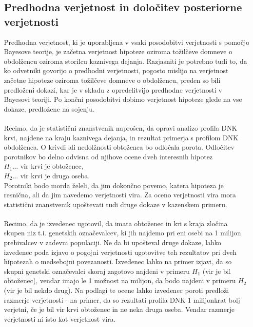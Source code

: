 \documentclass[12pt,a4paper]{amsart}
\theoremstyle{definition} %
\theoremstyle{plain} %
\begin{document}
\subsection{Predhodna verjetnost in določitev posteriorne verjetnosti}
Predhodna verjetnost, ki je uporabljena v vsaki posodobitvi verjetnosti s pomočjo Bayesove teorije, je začetna verjetnost hipoteze oziroma tožilčeve domneve 
o obdolžencu oziroma storilcu kaznivega dejanja. Razjasniti je potrebno tudi to, da ko odvetniki govorijo o predhodni verjetnosti, pogosto mislijo na verjetnost 
začetne hipoteze oziroma tožilčeve domneve o obdolžencu, preden so bili predloženi dokazi, kar je v skladu z opredelitvijo predhodne verjetnosti v Bayesovi 
teoriji. Po končni posodobitvi dobimo verjetnost hipoteze glede na vse dokaze, predložene na sojenju.\\\\
Recimo, da je statistični znanstvenik naprošen, da opravi analizo profila DNK krvi, najdene na kraju kaznivega dejanja, in rezultat primerja s profilom DNK
obdolženca. O krivdi ali nedolžnosti obtoženca bo odločala porota. Odločitev porotnikov bo delno odvisna od njihove ocene dveh interesnih
hipotez\\
$H_1 \dots$ vir krvi je obtoženec,\\
$H_2 \dots$ vir krvi je druga oseba.\\
Porotniki bodo morda želeli, da jim dokončno povemo, katera hipoteza je resnična, ali da jim navedemo verjetnosti vira. Za oceno verjetnosti 
vira mora statistični znanstvenik upoštevati tudi druge dokaze v kazenskem primeru.\\\\
Recimo, da je izvedenec ugotovil, da imata obtoženec in kri s kraja zločina skupen niz t.i. genetskih označevalcev, ki jih najdemo pri eni osebi
na 1 milijon prebivalcev v zadevni populaciji. Ne da bi upošteval druge dokaze, lahko izvedenec poda izjavo o pogojni verjetnosti
ugotovitve teh rezultatov pri dveh hipotezah o medsebojni povezanosti. Izvedenec lahko na primer izjavi, da so skupni genetski označevalci
skoraj zagotovo najdeni v primeru $H_1$ (vir je bil obtoženec), vendar imajo le 1 možnost na milijon, da bodo najdeni v primeru $H_2$ (vir je bil
nekdo drug). Na podlagi te ocene lahko izvedenec poroti predloži razmerje verjetnosti - na primer, da so rezultati profila DNK 1 milijonkrat
bolj verjetni, če je bil vir krvi obtoženec in ne neka druga oseba. Vendar razmerje verjetnosti ni isto kot verjetnost vira. \\
\end{document}

